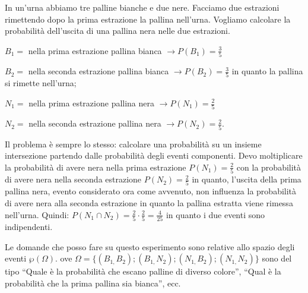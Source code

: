 \begin{esempio}
In un'urna abbiamo tre palline bianche e due nere. Facciamo due estrazioni 
rimettendo dopo la prima estrazione la pallina nell'urna. Vogliamo calcolare la 
probabilità dell'uscita di una pallina nera nelle due estrazioni.
\begin{itemize*}
\item $ B_{1}= $ nella prima estrazione pallina bianca $\to P(B_1)=\frac 3 5$
\item $ B_{2}= $ nella seconda estrazione pallina bianca $\to P(B_2)=\frac 3 5$ 
in quanto la pallina si rimette nell'urna;
\item $ N_{1}= $ nella prima estrazione pallina nera $\to P(N_1)=\frac 2 5$
\item $ N_{2}= $ nella seconda estrazione pallina nera $\to P(N_2)=\frac 2 5$.
\end{itemize*}
Il problema è sempre lo stesso: calcolare una probabilità su un insieme 
intersezione partendo dalle probabilità degli eventi componenti. Devo 
moltiplicare la probabilità di avere nera nella prima estrazione $P(N_1)=\frac 
2 
5$ con la probabilità di avere nera nella seconda estrazione $P(N_2)=\frac 2 5$ 
in quanto, l'uscita della prima pallina nera, evento considerato ora come 
avvenuto, non influenza la probabilità di avere nera alla seconda estrazione in 
quanto la pallina estratta viene rimessa nell'urna. Quindi: $P(N_1\cap 
N_2)=\frac 2 5\cdot \frac 2 5=\frac 4{25}$ in quanto i due eventi sono 
indipendenti.
\begin{center}
 
\end{center}
Le domande che posso fare su questo esperimento sono relative allo spazio degli 
eventi $\wp (\Omega ).$ ove $\Omega 
=\{(B_{1,}B_2);(B_{1,}N_2);(N_{1,}B_2);(N_{1,}N_2)\}$ sono del tipo ``Quale è 
la 
probabilità che escano palline di diverso colore'', ``Qual è la probabilità che 
la prima pallina sia bianca'', ecc.
\end{esempio}

